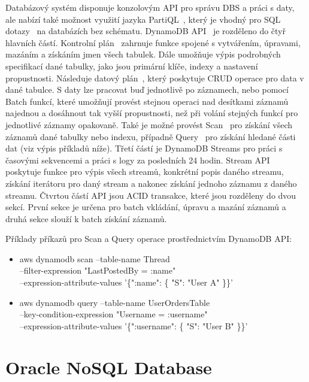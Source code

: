\documentclass[czech,master,dept460,male,csharp,cpdeclaration]{diploma}
\begin{document}
	Databázový systém disponuje konzolovým API pro správu DBS a práci s daty, ale nabízí také možnost využití jazyka PartiQL~\cite{partiql}, který je vhodný pro SQL dotazy~\cite{what-is-sql} na databázích bez schématu. DynamoDB API~\cite{api-dynamodb} je rozděleno do čtyř hlavních částí. Kontrolní plán~\cite{control-plan-dynamodb, api-dynamodb} zahrnuje funkce spojené s vytvářením, úpravami, mazáním a získáním jmen všech tabulek. Dále umožňuje výpis podrobných specifikací dané tabulky, jako jsou primární klíče, indexy a nastavení propustnosti. Následuje datový plán~\cite{api-dynamodb}, který poskytuje CRUD operace pro data v dané tabulce. S daty lze pracovat buď jednotlivě po záznamech, nebo pomocí Batch funkcí, které umožňují provést stejnou operaci nad desítkami záznamů najednou a dosáhnout tak vyšší propustnosti, než při volání stejných funkcí pro jednotlivé záznamy opakovaně. Také je možné provést Scan~\cite{scan-dynamo} pro získání všech záznamů dané tabulky nebo indexu, případně Query~\cite{query-dynamo} pro získání hledané části dat (viz výpis příkladů níže). Třetí částí je DynamoDB Streams pro práci s časovými sekvencemi a práci s logy za posledních 24 hodin. Stream API poskytuje funkce pro výpis všech streamů, konkrétní popis daného streamu, získání iterátoru pro daný stream a nakonec získání jednoho záznamu z daného streamu. Čtvrtou částí API jsou ACID transakce, které jsou rozděleny do dvou sekcí. První sekce je určena pro batch vkládání, úpravu a mazání záznamů a druhá sekce slouží k batch získání záznamů.
	
	Příklady příkazů pro Scan a Query operace prostřednictvím DynamoDB API:
	\begin{itemize}
		\item aws dynamodb scan --table-name Thread \\
			 --filter-expression "LastPostedBy = :name" \\
			 --expression-attribute-values '\{":name": \{ "S": "User A" \}\}'~\cite{scan-dynamo}
		\item aws dynamodb query --table-name UserOrdersTable \\
			 --key-condition-expression "Username = :username" \\
			 --expression-attribute-values '\{":username": \{ "S": "User B" \}\}'~\cite{query-dynamo}
	\end{itemize}
	
	\section{Oracle NoSQL Database}
	
\end{document}
